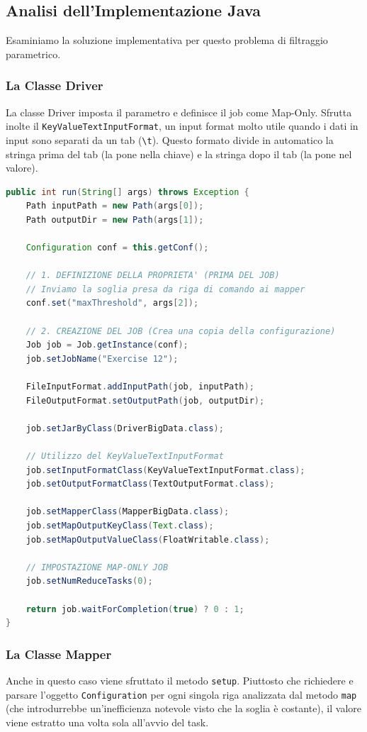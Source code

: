 \subsection{Analisi dell'Implementazione Java}

Esaminiamo la soluzione implementativa per questo problema di filtraggio parametrico.

\subsubsection{La Classe Driver}
La classe Driver imposta il parametro e definisce il job come Map-Only. Sfrutta inolte il \texttt{KeyValueTextInputFormat}, un input format molto utile quando i dati in input sono separati da un tab (\texttt{\textbackslash t}). Questo formato divide in automatico la stringa prima del tab (la pone nella chiave) e la stringa dopo il tab (la pone nel valore).

\begin{lstlisting}[language=Java]
public int run(String[] args) throws Exception {
    Path inputPath = new Path(args[0]);
    Path outputDir = new Path(args[1]);

    Configuration conf = this.getConf();

    // 1. DEFINIZIONE DELLA PROPRIETA' (PRIMA DEL JOB)
    // Inviamo la soglia presa da riga di comando ai mapper
    conf.set("maxThreshold", args[2]);

    // 2. CREAZIONE DEL JOB (Crea una copia della configurazione)
    Job job = Job.getInstance(conf);
    job.setJobName("Exercise 12");

    FileInputFormat.addInputPath(job, inputPath);
    FileOutputFormat.setOutputPath(job, outputDir);

    job.setJarByClass(DriverBigData.class);

    // Utilizzo del KeyValueTextInputFormat
    job.setInputFormatClass(KeyValueTextInputFormat.class);
    job.setOutputFormatClass(TextOutputFormat.class);

    job.setMapperClass(MapperBigData.class);
    job.setMapOutputKeyClass(Text.class);
    job.setMapOutputValueClass(FloatWritable.class);

    // IMPOSTAZIONE MAP-ONLY JOB
    job.setNumReduceTasks(0);

    return job.waitForCompletion(true) ? 0 : 1;
}
\end{lstlisting}

\subsubsection{La Classe Mapper}
Anche in questo caso viene sfruttato il metodo \texttt{setup}. Piuttosto che richiedere e parsare l'oggetto \texttt{Configuration} per ogni singola riga analizzata dal metodo \texttt{map} (che introdurrebbe un'inefficienza notevole visto che la soglia è costante), il valore viene estratto una volta sola all'avvio del task.


